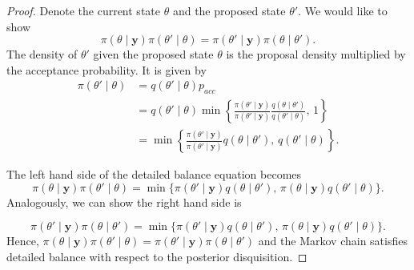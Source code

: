 \documentclass[
]{book}
\theoremstyle{definition}
\theoremstyle{definition}
\theoremstyle{definition}
\theoremstyle{definition}
\theoremstyle{remark}
\begin{document}
\begin{proof}
Denote the current state \(\theta\) and the proposed state \(\theta'\). We would like to show
\[
\pi(\theta \mid \boldsymbol{y}) \pi(\theta'\mid\theta) = \pi(\theta' \mid \boldsymbol{y}) \pi(\theta\mid\theta').
\]
The density of \(\theta'\) given the proposed state \(\theta\) is the proposal density multiplied by the acceptance probability. It is given by
\begin{align*}
\pi(\theta' \mid \theta) &= q(\theta' \mid \theta)p_{acc}\\
&=  q(\theta' \mid \theta)\min\left\{\frac{\pi(\theta' \mid \boldsymbol{y})}{\pi(\theta' \mid \boldsymbol{y})}\frac{q(\theta \mid \theta')}{q(\theta' \mid \theta)}, \, 1\right\} \\
& = \min\left\{\frac{\pi(\theta' \mid \boldsymbol{y})}{\pi(\theta' \mid \boldsymbol{y})}q(\theta \mid \theta'),\, q(\theta' \mid \theta)\right\}.
\end{align*}

The left hand side of the detailed balance equation becomes
\[
\pi(\theta \mid \boldsymbol{y})\pi(\theta' \mid \theta) = \min\{\pi(\theta' \mid \boldsymbol{y})q(\theta \mid \theta'),\, \pi(\theta \mid \boldsymbol{y})q(\theta' \mid \theta)\}.
\]
Analogously, we can show the right hand side is

\[
\pi(\theta' \mid \boldsymbol{y})\pi(\theta \mid \theta') = \min\{\pi(\theta' \mid \boldsymbol{y})q(\theta \mid \theta'),\, \pi(\theta \mid \boldsymbol{y})q(\theta' \mid \theta)\}.
\]
Hence, \(\pi(\theta \mid \boldsymbol{y}) \pi(\theta'\mid\theta) = \pi(\theta' \mid \boldsymbol{y}) \pi(\theta\mid\theta')\) and the Markov chain satisfies detailed balance with respect to the posterior disquisition.
\end{proof}
\end{document}

